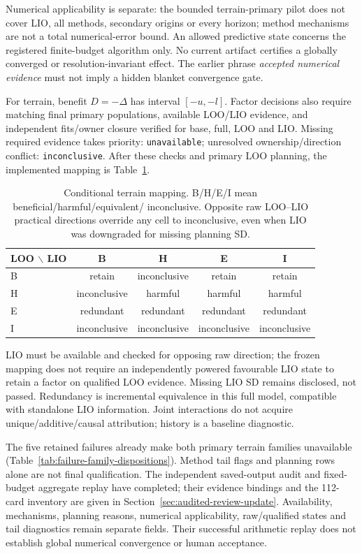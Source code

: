 \documentclass[11pt]{article}
\begin{document}
Numerical applicability is separate: the bounded terrain-primary pilot
does not cover LIO, all methods, secondary origins or every horizon;
method mechanisms are not a total numerical-error bound. An allowed predictive
state concerns the registered finite-budget algorithm only. No current artifact
certifies a globally converged or resolution-invariant effect. The earlier
phrase \emph{accepted numerical evidence} must not imply a hidden blanket
convergence gate.

For terrain, benefit \(D=-\Delta\) has interval \([-u,-l]\).
Factor decisions also require matching final primary populations, available
LOO/LIO evidence, and independent fits/owner closure verified for base,
full, LOO and LIO. Missing required evidence takes priority:
\texttt{unavailable}; unresolved ownership/direction conflict:
\texttt{inconclusive}. After these checks and primary LOO planning,
the implemented mapping is Table~\ref{tab:loo-lio-states}.

\begin{table}[htbp]
\centering\small
\caption{Conditional terrain mapping. B/H/E/I mean beneficial/harmful/equivalent/
inconclusive. Opposite raw LOO--LIO practical directions override any cell
to inconclusive, even when LIO was downgraded for missing planning SD.}
\label{tab:loo-lio-states}
\begin{tabular}{lcccc}
\toprule
LOO \(\backslash\) LIO & B & H & E & I\\
\midrule
B & retain & inconclusive & retain & retain\\
H & inconclusive & harmful & harmful & harmful\\
E & redundant & redundant & redundant & redundant\\
I & inconclusive & inconclusive & inconclusive & inconclusive\\
\bottomrule
\end{tabular}
\end{table}

LIO must be available and checked for opposing raw direction; the frozen
mapping does not require an independently powered favourable LIO state
to retain a factor on qualified LOO evidence. Missing LIO SD remains disclosed,
not passed. Redundancy is incremental equivalence in this full model,
compatible with standalone LIO information. Joint interactions do not acquire
unique/additive/causal attribution; history is a baseline diagnostic.

The five retained failures already make both primary terrain families
unavailable (Table~\ref{tab:failure-family-dispositions}). Method tail flags
and planning rows alone are not final qualification. The independent saved-output
audit and fixed-budget aggregate replay have completed; their evidence bindings
and the 112-card inventory are given in Section~\ref{sec:audited-review-update}.
Availability, mechanisms, planning reasons, numerical applicability, raw/qualified
states and tail diagnostics remain separate fields. Their successful arithmetic
replay does not establish global numerical convergence or human acceptance.
\end{document}
